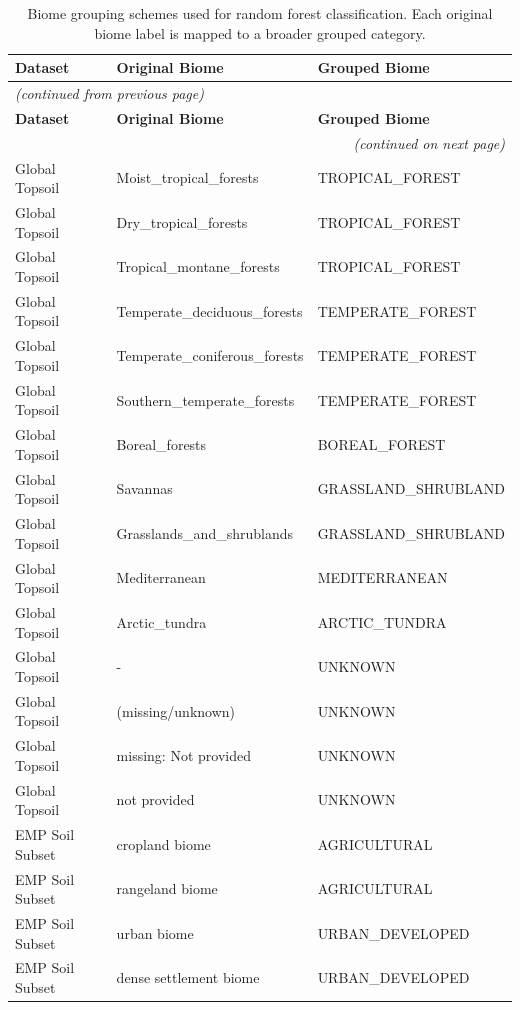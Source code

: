 \documentclass[12pt, oneside]{report}
\begin{document}
\begingroup\small
\begin{longtable}{llp{5cm}}
\caption[Biome grouping schemes]{Biome grouping schemes used for random forest classification. Each original biome label is mapped to a broader grouped category.}
\label{tab:supp5c} \\
\toprule
\textbf{Dataset} & \textbf{Original Biome} & \textbf{Grouped Biome} \\
\midrule
\endfirsthead
\multicolumn{3}{l}{\small\itshape(continued from previous page)} \\[2pt]
\toprule
\textbf{Dataset} & \textbf{Original Biome} & \textbf{Grouped Biome} \\
\midrule
\endhead
\midrule\multicolumn{3}{r}{\small\itshape(continued on next page)} \\
\endfoot
\bottomrule
\endlastfoot
Global Topsoil & Moist\_tropical\_forests & TROPICAL\_FOREST \\
Global Topsoil & Dry\_tropical\_forests & TROPICAL\_FOREST \\
Global Topsoil & Tropical\_montane\_forests & TROPICAL\_FOREST \\
Global Topsoil & Temperate\_deciduous\_forests & TEMPERATE\_FOREST \\
Global Topsoil & Temperate\_coniferous\_forests & TEMPERATE\_FOREST \\
Global Topsoil & Southern\_temperate\_forests & TEMPERATE\_FOREST \\
Global Topsoil & Boreal\_forests & BOREAL\_FOREST \\
Global Topsoil & Savannas & GRASSLAND\_SHRUBLAND \\
Global Topsoil & Grasslands\_and\_shrublands & GRASSLAND\_SHRUBLAND \\
Global Topsoil & Mediterranean & MEDITERRANEAN \\
Global Topsoil & Arctic\_tundra & ARCTIC\_TUNDRA \\
Global Topsoil & - & UNKNOWN \\
Global Topsoil & (missing/unknown) & UNKNOWN \\
Global Topsoil & missing: Not provided & UNKNOWN \\
Global Topsoil & not provided & UNKNOWN \\
EMP Soil Subset & cropland biome & AGRICULTURAL \\
EMP Soil Subset & rangeland biome & AGRICULTURAL \\
EMP Soil Subset & urban biome & URBAN\_DEVELOPED \\
EMP Soil Subset & dense settlement biome & URBAN\_DEVELOPED \\

\end{longtable}
\end{document}
